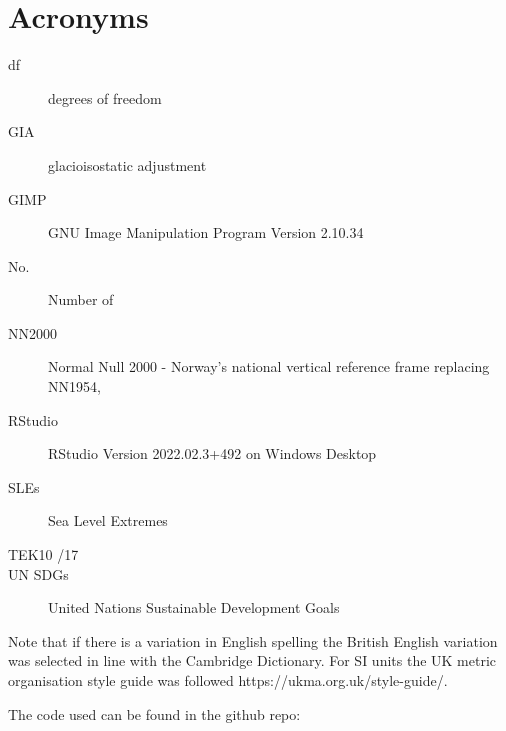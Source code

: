 
\chapter{Acronyms}
\begin{description}
\item[df]degrees of freedom
\item[GIA] glacioisostatic adjustment
\item[GIMP] GNU Image Manipulation Program Version 2.10.34
\item[No.] Number of
\item[NN2000] Normal Null 2000 - Norway's national vertical reference frame replacing NN1954, 
\item [RStudio] RStudio Version 2022.02.3+492 on Windows Desktop
\item[SLEs] Sea Level Extremes
\item[TEK10 /17]
\item [UN SDGs] United Nations Sustainable Development Goals 
\end{description}

Note that if there is a variation in English spelling the British English variation was selected in line with the Cambridge Dictionary. For SI units the UK metric organisation style guide was followed https://ukma.org.uk/style-guide/.  

The code used can be found in the github repo: 